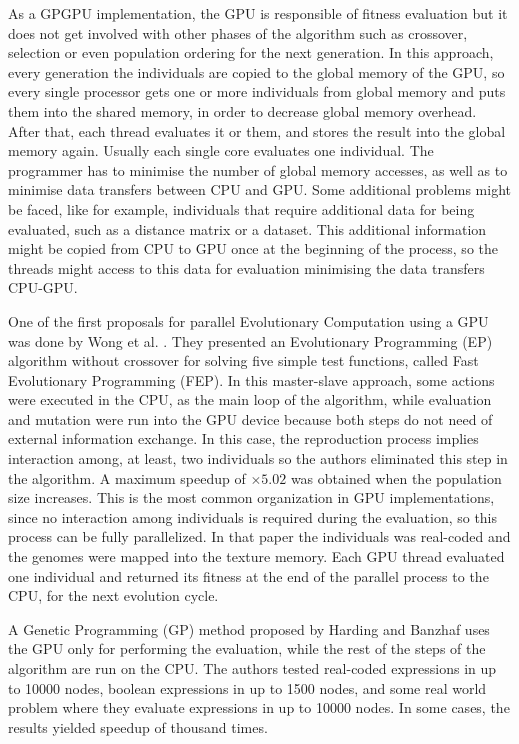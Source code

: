 \documentclass{comjnl}
\begin{document}
As a GPGPU implementation, the GPU is responsible of fitness evaluation but it does not get involved with other phases of the algorithm such as crossover, selection or even population ordering for the next generation. In this approach, every generation the individuals are copied to the global memory of the GPU, so every single processor gets one or more individuals from global memory and puts them into the shared memory, in order to decrease global memory overhead. After that, each thread evaluates it or them, and stores the result into the global memory again. Usually each single core evaluates one individual. The programmer has to minimise the number of global memory accesses, as well as to minimise data transfers between CPU and GPU. Some additional problems might be faced, like for example, individuals that require additional data for being evaluated, such as a distance matrix or a dataset. This additional information might be copied from CPU to GPU once at the beginning of the process, so the threads might access to this data for evaluation minimising the data transfers CPU-GPU. 

One of the first proposals for parallel Evolutionary Computation using a GPU was done by Wong et al. \cite{man-leung-wong-parallel-2005}. They presented an Evolutionary Programming (EP) algorithm without crossover for solving five simple test functions, called Fast Evolutionary Programming (FEP). In this master-slave approach, some actions were executed in the CPU, as the main loop of the algorithm, while evaluation and mutation were run into the GPU device because both steps do not need of external information exchange. In this case, the reproduction process implies interaction among, at least, two individuals so the authors eliminated this step in the algorithm. A maximum speedup of $\times5.02$ was obtained when the population size increases. This is the most common organization in GPU implementations, since no interaction among individuals is required during the evaluation, so this process can be fully parallelized. In that paper the individuals was real-coded and the genomes were mapped into the texture memory. Each GPU thread evaluated one individual and returned its fitness at the end of the parallel process to the CPU, for the next evolution cycle.

A Genetic Programming (GP) method proposed by Harding and Banzhaf \cite{4215552} uses the GPU only for performing the evaluation, while the rest of the steps of the algorithm are run on the CPU. The authors tested real-coded expressions in up to 10000 nodes, boolean expressions in up to 1500 nodes, and some real world problem where they evaluate expressions in up to 10000 nodes. In some cases, the results yielded speedup of thousand times.
\end{document}
